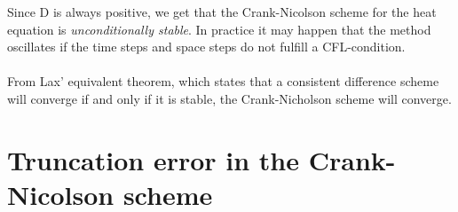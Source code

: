 Since D is always positive, we get that the Crank-Nicolson
scheme for the heat equation is \emph{unconditionally stable}. In practice it may happen that the method oscillates if the time steps and space steps do not fulfill a CFL-condition.
\\
\\
From Lax' equivalent theorem, which states that a consistent difference scheme will converge if and only if it is stable, the Crank-Nicholson scheme will converge.


\section{Truncation error in the Crank-Nicolson scheme}

